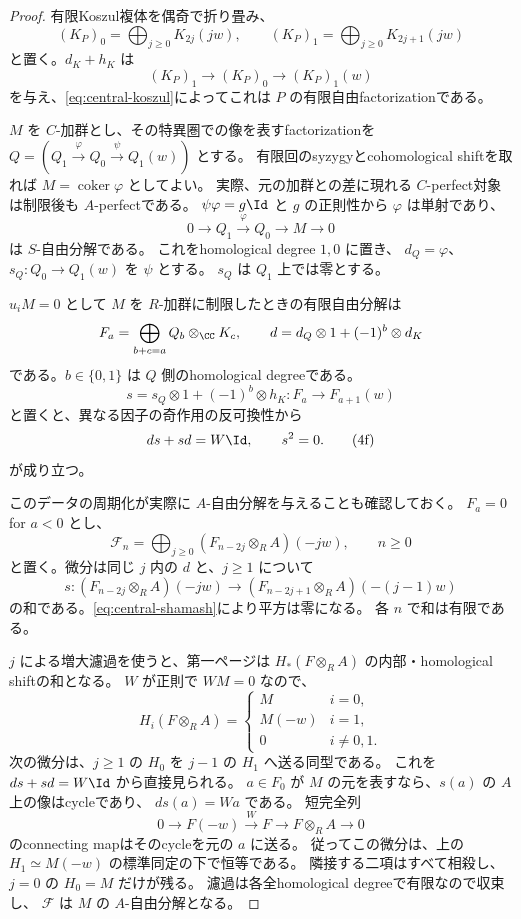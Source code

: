 \begin{proof}
 有限Koszul複体を偶奇で折り畳み、
 \[
 (K_P)_0=\bigoplus_{j\ge0}K_{2j}(jw),\qquad
 (K_P)_1=\bigoplus_{j\ge0}K_{2j+1}(jw)
 \]
 と置く。\(d_K+h_K\) は
 \[
 (K_P)_1\longrightarrow(K_P)_0
             \longrightarrow(K_P)_1(w)
 \]
 を与え、\eqref{eq:central-koszul}によってこれは \(P\) の有限自由factorizationである。

 \(M\) を \(C\)-加群とし、その特異圏での像を表すfactorizationを
 \(Q=(Q_1\xrightarrow\varphi Q_0\xrightarrow\psi Q_1(w))\) とする。
 有限回のsyzygyとcohomological shiftを取れば
 \(M=\operatorname{coker}\varphi\) としてよい。
 実際、元の加群との差に現れる \(C\)-perfect対象は制限後も \(A\)-perfectである。
 \(\psi\varphi=g\Id\) と \(g\) の正則性から \(\varphi\) は単射であり、
 \[
 0\longrightarrow Q_1\xrightarrow\varphi Q_0\longrightarrow M\longrightarrow0
 \]
 は \(S\)-自由分解である。
 これをhomological degree \(1,0\) に置き、
 \(d_Q=\varphi\)、\(s_Q:Q_0\to Q_1(w)\) を \(\psi\) とする。
 \(s_Q\) は \(Q_1\) 上では零とする。

 \(u_iM=0\) として \(M\) を \(R\)-加群に制限したときの有限自由分解は
 \[
 F_a=\bigoplus_{b+c=a}Q_b\otimes_\CC K_c,
 \qquad d=d_Q\otimes1+(-1)^b\otimes d_K
 \]
 である。\(b\in\{0,1\}\) は \(Q\) 側のhomological degreeである。
 \[
 s=s_Q\otimes1+(-1)^b\otimes h_K:F_a\longrightarrow F_{a+1}(w)
 \]
 と置くと、異なる因子の奇作用の反可換性から
 \[
 ds+sd=W\Id,\qquad s^2=0.                                  \tag{4f}\label{eq:central-shamash}
 \]
 が成り立つ。

 このデータの周期化が実際に \(A\)-自由分解を与えることも確認しておく。
 \(F_a=0\) for \(a<0\) とし、
 \[
 \mathcal F_n=
 \bigoplus_{j\ge0}(F_{n-2j}\otimes_R A)(-jw),\qquad n\ge0
 \]
 と置く。微分は同じ \(j\) 内の \(d\) と、\(j\ge1\) について
 \[
 s:(F_{n-2j}\otimes_R A)(-jw)
 \longrightarrow(F_{n-2j+1}\otimes_R A)(-(j-1)w)
 \]
 の和である。\eqref{eq:central-shamash}により平方は零になる。
 各 \(n\) で和は有限である。

 \(j\) による増大濾過を使うと、第一ページは
 \(H_*(F\otimes_R A)\) の内部・homological shiftの和となる。
 \(W\) が正則で \(WM=0\) なので、
 \[
 H_i(F\otimes_R A)=
 \begin{cases}
 M&i=0,\\
 M(-w)&i=1,\\
 0&i\ne0,1.
 \end{cases}
 \]
 次の微分は、\(j\ge1\) の \(H_0\) を \(j-1\) の \(H_1\) へ送る同型である。
 これを \(ds+sd=W\Id\) から直接見られる。
 \(a\in F_0\) が \(M\) の元を表すなら、\(s(a)\) の \(A\) 上の像はcycleであり、
 \(d s(a)=Wa\) である。
 短完全列
 \[
 0\longrightarrow F(-w)\xrightarrow{W}F
      \longrightarrow F\otimes_R A\longrightarrow0
 \]
 のconnecting mapはそのcycleを元の \(a\) に送る。
 従ってこの微分は、上の \(H_1\simeq M(-w)\) の標準同定の下で恒等である。
 隣接する二項はすべて相殺し、\(j=0\) の \(H_0=M\) だけが残る。
 濾過は各全homological degreeで有限なので収束し、
 \(\mathcal F\) は \(M\) の \(A\)-自由分解となる。


\end{proof}
